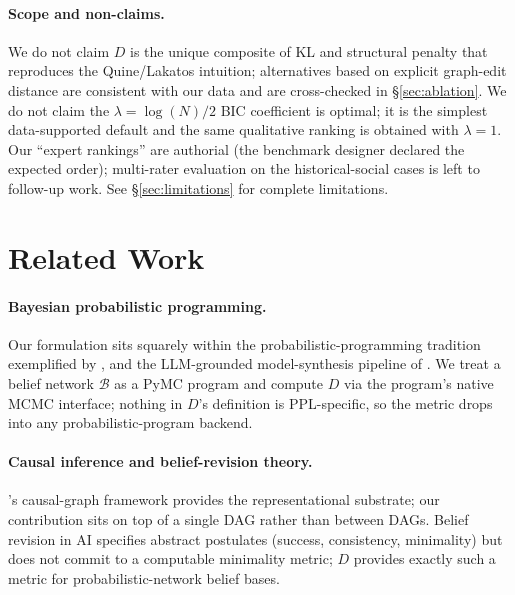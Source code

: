 \documentclass{article}
\begin{document}
\paragraph{Scope and non-claims.} We do not claim $D$ is the unique
composite of KL and structural penalty that reproduces the
Quine/Lakatos intuition; alternatives based on explicit graph-edit
distance are consistent with our data and are cross-checked in
\S\ref{sec:ablation}. We do not claim the $\lambda = \log(N)/2$ BIC
coefficient is optimal; it is the simplest data-supported default
and the same qualitative ranking is obtained with $\lambda = 1$. Our
``expert rankings'' are authorial (the benchmark designer declared
the expected order); multi-rater evaluation on the historical-social
cases is left to follow-up work. See \S\ref{sec:limitations} for
complete limitations.

\section{Related Work}
\label{sec:related}

\paragraph{Bayesian probabilistic programming.} Our formulation sits
squarely within the probabilistic-programming tradition exemplified by
\citet{bingham2019pyro, salvatier2016pymc, gordon2014measure,
goodman2014dippl}, and the LLM-grounded model-synthesis pipeline of
\citet{wong2023wordmodels}. We treat a belief network $\mathcal{B}$ as
a PyMC program \citep{salvatier2016pymc, phan2019numpyro} and compute
$D$ via the program's native MCMC interface; nothing in
$D$'s definition is PPL-specific, so the metric drops into any
probabilistic-program backend.

\paragraph{Causal inference and belief-revision theory.}
\citet{pearl1988probabilistic, pearl2000causality}'s causal-graph
framework provides the representational substrate; our contribution
sits on top of a single DAG rather than between DAGs. Belief revision
in AI \citep{agm1985partial, katsuno1991propositional} specifies
abstract postulates (success, consistency, minimality) but does not
commit to a computable minimality metric; $D$ provides exactly such a
metric for probabilistic-network belief bases.
\end{document}
